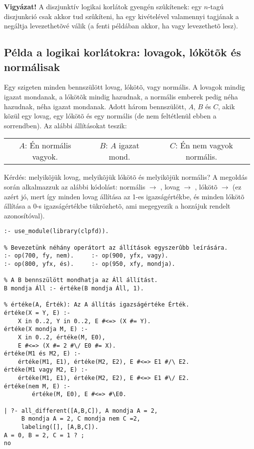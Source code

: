 {\bf Vigyázat!} A diszjunktív logikai korlátok gyengén szûkítenek: egy $n$-tagú
diszjunkció csak akkor tud szûkíteni, ha egy kivételével valamennyi tagjának a
negáltja levezethetõvé válik (a fenti példában akkor, ha  vagy 
levezethetõ lesz).

\subsection{Példa a logikai korlátokra: lovagok, lókötõk és normálisak}

Egy szigeten minden bennszülött lovag, lókötõ, vagy normális. A lovagok mindig
igazat mondanak, a lókötõk mindig hazudnak, a normális emberek pedig néha
hazudnak, néha igazat mondanak. Adott három bennszülött, $A$, $B$ és $C$, akik
közül egy lovag, egy lókötõ és egy normális (de nem feltétlenül ebben a sorrendben).
Az alábbi állításokat teszik:

\begin{center}\begin{tabular}{ccc}
$A$: Én normális vagyok. & $B$: $A$ igazat mond. & $C$: Én nem vagyok normális.
\end{tabular}\end{center}

Kérdés: melyikõjük lovag, melyikõjük lókötõ és melyikõjük normális?
\br
A \clpfd megoldás során alkalmazzuk az alábbi kódolást: normális $\to$ ,
lovag $\to$ , lókötõ $\to$  (ez azért jó, mert így minden lovag
állítása az 1-es igazságértékbe, és minden lókötõ állítása a 0-s igazságértékbe
tükrözhetõ, ami megegyezik a hozzájuk rendelt azonosítóval).

\begin{verbatim}
:- use_module(library(clpfd)).

% Bevezetünk néhány operátort az állítások egyszerûbb leírására.
:- op(700, fy, nem).     :- op(900, yfx, vagy).  
:- op(800, yfx, és).     :- op(950, xfy, mondja).

% A B bennszülött mondhatja az Áll állítást.
B mondja Áll :- értéke(B mondja Áll, 1).

% értéke(A, Érték): Az A állítás igazságértéke Érték.
értéke(X = Y, E) :-
    X in 0..2, Y in 0..2, E #<=> (X #= Y).
értéke(X mondja M, E) :-
    X in 0..2, értéke(M, E0), 
    E #<=> (X #= 2 #\/ E0 #= X).
értéke(M1 és M2, E) :-
    értéke(M1, E1), értéke(M2, E2), E #<=> E1 #/\ E2.
értéke(M1 vagy M2, E) :-
    értéke(M1, E1), értéke(M2, E2), E #<=> E1 #\/ E2.
értéke(nem M, E) :-
        értéke(M, E0), E #<=> #\E0.

| ?- all_different([A,B,C]), A mondja A = 2, 
     B mondja A = 2, C mondja nem C =2,
     labeling([], [A,B,C]).
A = 0, B = 2, C = 1 ? ;
no
\end{verbatim}

